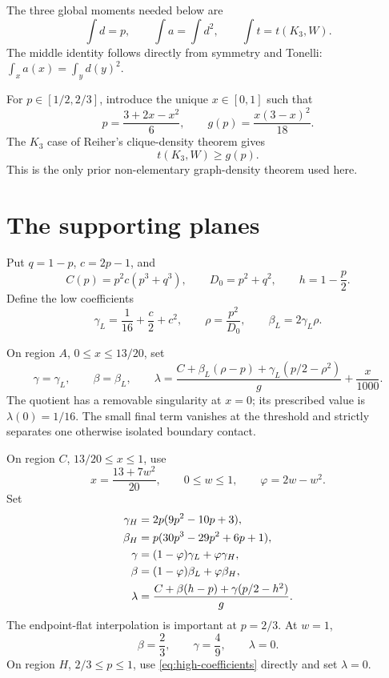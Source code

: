 \documentclass[11pt]{article}
\begin{document}
The three global moments needed below are
\begin{equation}
 \int d=p,\qquad \int a=\int d^2,\qquad
 \int t=t(K_3,W).
 \label{eq:moments}
\end{equation}
The middle identity follows directly from symmetry and Tonelli:
$\int_xa(x)=\int_yd(y)^2$.

For $p\in[1/2,2/3]$, introduce the unique $x\in[0,1]$ such that
\begin{equation}
 p=\frac{3+2x-x^2}{6},\qquad
 g(p)=\frac{x(3-x)^2}{18}.
 \label{eq:triangle-profile}
\end{equation}
The $K_3$ case of Reiher's clique-density theorem gives
\begin{equation}
 t(K_3,W)\ge g(p).
 \label{eq:reiher}
\end{equation}
This is the only prior non-elementary graph-density theorem used here.

\section{The supporting planes}

Put $q=1-p$, $c=2p-1$, and
\[
 C(p)=p^2c(p^3+q^3),\qquad D_0=p^2+q^2,\qquad h=1-\frac p2.
\]
Define the low coefficients
\begin{equation}
 \gamma_L=\frac1{16}+\frac c2+c^2,\qquad
 \rho=\frac{p^2}{D_0},\qquad
 \beta_L=2\gamma_L\rho.
 \label{eq:low-coefficients}
\end{equation}

On region $A$, $0\le x\le13/20$, set
\begin{equation}
 \gamma=\gamma_L,\qquad \beta=\beta_L,\qquad
 \lambda=
 \frac{C+\beta_L(\rho-p)+\gamma_L(p/2-\rho^2)}{g}
 +\frac{x}{1000}.
 \label{eq:region-a}
\end{equation}
The quotient has a removable singularity at $x=0$; its prescribed value is
$\lambda(0)=1/16$.  The small final term vanishes at the threshold and
strictly separates one otherwise isolated boundary contact.

On region $C$, $13/20\le x\le1$, use
\begin{equation}
 x=\frac{13+7w^2}{20},\qquad 0\le w\le1,\qquad
 \varphi=2w-w^2.
 \label{eq:transition-parameter}
\end{equation}
Set
\begin{align}
 \gamma_H&=2p(9p^2-10p+3),\notag\\
 \beta_H&=p(30p^3-29p^2+6p+1),\label{eq:high-coefficients}\\
 \gamma&=(1-\varphi)\gamma_L+\varphi\gamma_H,\notag\\
 \beta&=(1-\varphi)\beta_L+\varphi\beta_H,\notag\\
 \lambda&=\frac{C+\beta(h-p)+\gamma(p/2-h^2)}{g}.
 \label{eq:region-c}
\end{align}
The endpoint-flat interpolation is important at $p=2/3$.  At $w=1$,
\begin{equation}
 \beta=\frac23,\qquad \gamma=\frac49,\qquad \lambda=0.
 \label{eq:join-coefficients}
\end{equation}
On region $H$, $2/3\le p\le1$, use \eqref{eq:high-coefficients} directly
and set $\lambda=0$.
\end{document}
